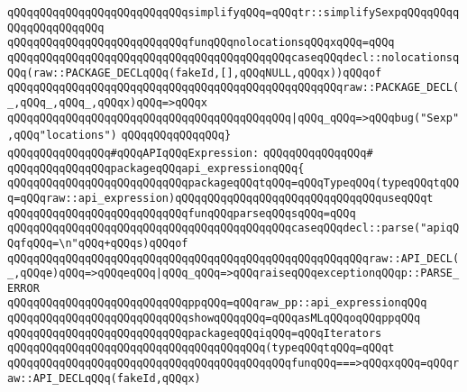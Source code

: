 \verb|qQQqqQQqqQQqqQQqqQQqqQQqqQQqsimplifyqQQq=qQQqtr::simplifySexpqQQqqQQqqQQqqQQqqQQqqQQq|\newline
\newline
\verb|qQQqqQQqqQQqqQQqqQQqqQQqqQQqfunqQQqnolocationsqQQqxqQQq=qQQq|\newline
\verb|qQQqqQQqqQQqqQQqqQQqqQQqqQQqqQQqqQQqqQQqqQQqcaseqQQqdecl::nolocationsqQQq(raw::PACKAGE_DECLqQQq(fakeId,[],qQQqNULL,qQQqx))qQQqof|\newline
\verb|qQQqqQQqqQQqqQQqqQQqqQQqqQQqqQQqqQQqqQQqqQQqqQQqqQQqraw::PACKAGE_DECL(_,qQQq_,qQQq_,qQQqx)qQQq=>qQQqx|\newline
\verb|qQQqqQQqqQQqqQQqqQQqqQQqqQQqqQQqqQQqqQQqqQQq|\verb#|qQQq_qQQq=>qQQqbug("Sexp",qQQq"locations")#\newline
\verb|qQQqqQQqqQQqqQQq}|\newline
\newline
\verb|qQQqqQQqqQQqqQQq#qQQqAPIqQQqExpression:|\newline
\verb|qQQqqQQqqQQqqQQq#|\newline
\verb|qQQqqQQqqQQqqQQqpackageqQQqapi_expressionqQQq{|\newline
\newline
\verb|qQQqqQQqqQQqqQQqqQQqqQQqqQQqpackageqQQqtqQQq=qQQqTypeqQQq(typeqQQqtqQQq=qQQqraw::api_expression)qQQqqQQqqQQqqQQqqQQqqQQqqQQqqQQquseqQQqt|\newline
\newline
\verb|qQQqqQQqqQQqqQQqqQQqqQQqqQQqfunqQQqparseqQQqsqQQq=qQQq|\newline
\verb|qQQqqQQqqQQqqQQqqQQqqQQqqQQqqQQqqQQqqQQqqQQqcaseqQQqdecl::parse("apiqQQqfqQQq=\n"qQQq+qQQqs)qQQqof|\newline
\verb|qQQqqQQqqQQqqQQqqQQqqQQqqQQqqQQqqQQqqQQqqQQqqQQqqQQqqQQqraw::API_DECL(_,qQQqe)qQQq=>qQQqeqQQq|\verb#|qQQq_qQQq=>qQQqraiseqQQqexceptionqQQqp::PARSE_ERROR#\newline
\newline
\verb|qQQqqQQqqQQqqQQqqQQqqQQqqQQqppqQQq=qQQqraw_pp::api_expressionqQQq|\newline
\verb|qQQqqQQqqQQqqQQqqQQqqQQqqQQqshowqQQqqQQq=qQQqasMLqQQqoqQQqppqQQq|\newline
\newline
\verb|qQQqqQQqqQQqqQQqqQQqqQQqqQQqpackageqQQqiqQQq=qQQqIterators|\newline
\verb|qQQqqQQqqQQqqQQqqQQqqQQqqQQqqQQqqQQqqQQq(typeqQQqtqQQq=qQQqt|\newline
\verb|qQQqqQQqqQQqqQQqqQQqqQQqqQQqqQQqqQQqqQQqqQQqfunqQQq===>qQQqxqQQq=qQQqraw::API_DECLqQQq(fakeId,qQQqx)|\newline

